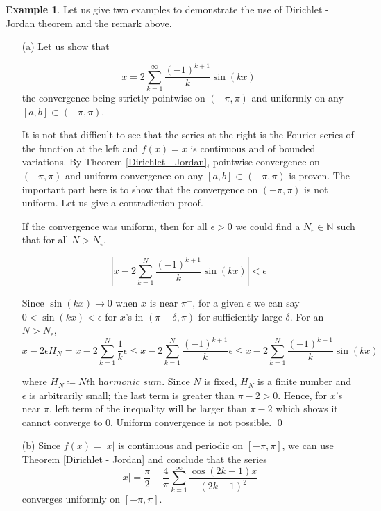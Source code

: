 \documentclass[12pt]{amsart}
\theoremstyle{definition}
\newtheorem{example}[theorem]{Example}
\newcommand{\NN}{{\mathbb N}} %
\begin{document}
\begin{example} Let us give two examples to demonstrate the use of Dirichlet - Jordan theorem and the remark above.
    \begin{itemize}
        \item[(a)]\footnotemark{}Let us show that

        

        
        \[
        x = 2\sum_{k=1}^{\infty}\frac{(-1)^{k+1}}{k}\sin(kx)
        \]
        the convergence being strictly pointwise on $(-\pi,\pi)$ and uniformly on any $[a,b] \subset (-\pi,\pi)$.


    It is not that difficult to see that the series at the right is the 
Fourier series of the function at the left and $f(x) = x$ is continuous and of bounded variations. By Theorem \ref{Dirichlet - Jordan}, pointwise convergence on $(-\pi,\pi)$ and uniform convergence on any $[a,b] \subset (-\pi,\pi)$ is proven. The important part here is to show that the convergence on $(-\pi,\pi)$ is not uniform. Let us give a contradiction proof.



If the convergence was uniform, then for all $\epsilon > 0$ we could find a $N_\epsilon \in \NN$ such that for all $N > N_\epsilon$,


\begin{equation*}\label{not uniform}
    \left|x - 2\sum_{k=1}^{N}\frac{(-1)^{k+1}}{k}\sin(kx)\right| < \epsilon
\end{equation*}



Since $\sin(kx) \to 0$ when $x$ is near $\pi^-$, for a given $\epsilon$ we can say $0 < \sin(kx) < \epsilon$ for $x$'s in $(\pi-\delta, \pi)$ for sufficiently large $\delta$. For an $N > N_\epsilon$,
\[
x - 2 \epsilon H_N = x - 2\sum_{k=1}^{N}\frac{1}{k}\epsilon \leq x - 2\sum_{k=1}^{N}\frac{(-1)^{k+1}}{k}\epsilon \leq x - 2\sum_{k=1}^{N}\frac{(-1)^{k+1}}{k}\sin(kx) 
\]


where $H_N \coloneqq N\textit{th harmonic sum}$. Since $N$ is fixed, $H_N$ is a finite number and $\epsilon$ is arbitrarily small; the last term is greater than $\pi - 2 > 0$. Hence, for $x$'s near $\pi$, left term of the inequality will be larger than $\pi - 2$ which shows it cannot converge to 0. Uniform convergence is not possible. \qed

        \item[(b)] Since $f(x) = |x|$ is continuous and periodic on $[-\pi,\pi]$, we can use Theorem \ref{Dirichlet - Jordan} and conclude that the series
        \[
        |x| = \frac{\pi}{2} - \frac{4}{\pi} \sum_{k=1}^{\infty}\frac{\cos(2k-1)x}{(2k-1)^2}
        \]
        converges uniformly on $[-\pi,\pi]$. 
    \end{itemize}
\end{example}
\end{document}
